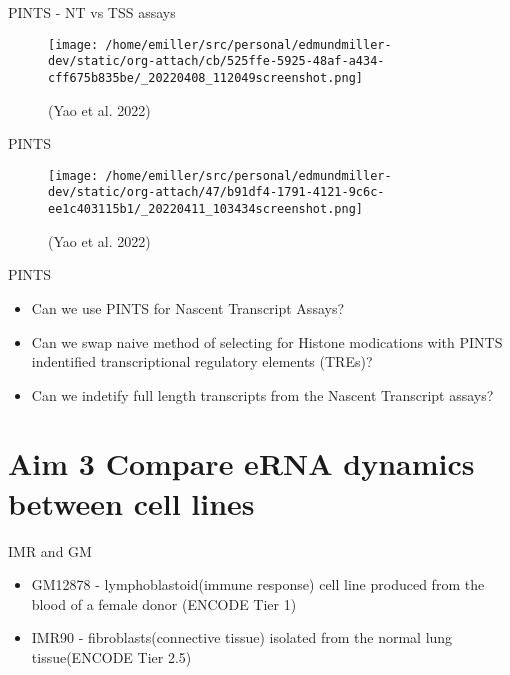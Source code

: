 \documentclass[bigger]{beamer}
\begin{document}
\begin{frame}[label={sec:org1acedfe}]{PINTS - NT vs TSS assays}
\begin{figure}[htbp]
\centering
\texttt{[image: /home/emiller/src/personal/edmundmiller-dev/static/org-attach/cb/525ffe-5925-48af-a434-cff675b835be/\_20220408\_112049screenshot.png]}
\caption{(Yao et al. 2022)}
\end{figure}
\end{frame}

\begin{frame}[label={sec:org21664d2}]{PINTS}
\begin{figure}[htbp]
\centering
\texttt{[image: /home/emiller/src/personal/edmundmiller-dev/static/org-attach/47/b91df4-1791-4121-9c6c-ee1c403115b1/\_20220411\_103434screenshot.png]}
\caption{(Yao et al. 2022)}
\end{figure}
\end{frame}


\begin{frame}[label={sec:orga438979}]{PINTS}
\begin{itemize}
\item Can we use PINTS for Nascent Transcript Assays?
\item Can we swap naive method of selecting for Histone modications with PINTS
indentified transcriptional regulatory elements (TREs)?
\item Can we indetify full length transcripts from the Nascent Transcript assays?
\end{itemize}
\end{frame}

\section*{Aim 3 Compare eRNA dynamics between cell lines}
\label{sec:org757c2b1}
\begin{frame}[label={sec:orgbf2fdfe}]{IMR and GM}
\begin{itemize}
\item GM12878 - lymphoblastoid(immune response) cell line produced from the blood of
a female donor (ENCODE Tier 1)
\item IMR90 - fibroblasts(connective tissue) isolated from the normal lung
tissue(ENCODE Tier 2.5)
\end{itemize}
\end{frame}
\end{document}
